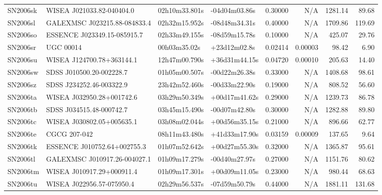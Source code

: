 \begin{longtable}{llllrrrr}
SN2006sk         &       WISEA J021033.82-040404.0 &   02h10m33.801s &   -04d04m03.86s &  0.30000 &      N/A &  1281.14 &       89.68 \\
SN2006sl         &  GALEXMSC J023215.88-084833.4   &   02h32m15.952s &   -08d48m34.31s &  0.40000 &      N/A &  1709.86 &      119.69 \\
SN2006so         &     ESSENCE J023349.15-085915.7 &   02h33m49.155s &   -08d59m15.78s &  0.10000 &      N/A &   425.07 &       29.76 \\
SN2006sr         &                       UGC 00014 &    00h03m35.02s &    +23d12m02.8s &  0.02414 &  0.00003 &    98.42 &        6.90 \\
SN2006su         &       WISEA J124700.78+363144.1 &   12h47m00.790s &   +36d31m44.15s &  0.04720 &  0.00010 &   205.63 &       14.40 \\
SN2006sw         &        SDSS J010500.20-002228.7 &   01h05m00.507s &   -00d22m26.38s &  0.33000 &      N/A &  1408.68 &       98.61 \\
SN2006sz         &        SDSS J234252.46-003322.9 &   23h42m52.460s &   -00d33m22.90s &  0.19000 &      N/A &   808.52 &       56.60 \\
SN2006ta         &       WISEA J032950.28+001742.6 &   03h29m50.349s &   +00d17m41.62s &  0.29000 &      N/A &  1239.73 &       86.78 \\
SN2006tb         &        SDSS J034515.48-000742.7 &   03h45m15.490s &   -00d07m42.80s &  0.30000 &      N/A &  1282.88 &       89.80 \\
SN2006tc         &       WISEA J030802.05+005635.1 &   03h08m02.044s &   +00d56m35.15s &  0.21000 &      N/A &   896.66 &       62.77 \\
SN2006te         &                    CGCG 207-042 &   08h11m43.480s &   +41d33m17.90s &  0.03159 &  0.00009 &   137.65 &        9.64 \\
SN2006tk         &     ESSENCE J010752.64+002755.3 &   01h07m52.642s &   +00d27m55.30s &  0.32000 &      N/A &  1365.87 &       95.61 \\
SN2006tl         &  GALEXMSC J010917.26-004027.1   &   01h09m17.279s &   -00d40m27.97s &  0.27000 &      N/A &  1151.76 &       80.62 \\
SN2006tm         &       WISEA J010917.29+000911.4 &   01h09m17.301s &   +00d09m11.05s &  0.23000 &      N/A &   980.44 &       68.63 \\
SN2006tu         &       WISEA J022956.57-075950.4 &   02h29m56.537s &   -07d59m50.79s &  0.44000 &      N/A &  1881.11 &      131.68 \\

\end{longtable}
